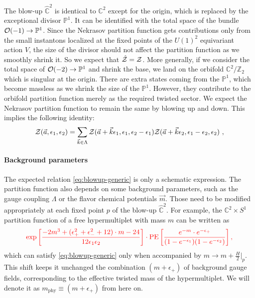 \documentclass[letterpaper, 11pt]{article}
\def\IC{\mathbb{C}}
\def\IP{\mathbb{P}}
\def\IZ{\mathbb{Z}}
\def\CO{{\cal O}}
\def\CZ{{\cal Z}}
\def\e{\epsilon}
\begin{document}
The blow-up $\hat{\IC}^2$ is identical to $\IC^2$ except for the origin, which is replaced by the exceptional divisor $\IP^1$. It can be identified with the total space of the bundle $\CO(-1) \to \IP^1$. 
Since the Nekrasov partition function gets contributions only from the small instantons localized at the fixed points of the $U(1)^2$ equivariant action $V$, the size of the divisor should not affect the partition function as we smoothly shrink it. So we expect that $\hat{\CZ} = \CZ$. More generally, if we consider the total space of $\CO(-2) \to \IP^1$ and shrink the base, we land on the orbifold $\IC^2/\IZ_2$ which is singular at the origin. There are extra states coming from the $\IP^1$, which become massless as we shrink the size of the $\IP^1$. However, they contribute to the orbifold partition function merely as the required twisted sector. We expect the Nekrasov partition function to remain the same by blowing up and down. This implies the following  identity: \cite{Nakajima:2003pg, Nakajima:2003uh,Nakajima:2005fg,Keller:2012da,Gu:2018gmy,Gu:2019dan}
\begin{align} 
  \label{eq:blowup-generic}
  \CZ(\vec{a}, \e_1, \e_2) = \sum_{\vec{k} \in \Lambda} \CZ(\vec{a}+ \vec{k} \e_1, \e_1, \e_2 - \e_1) \CZ(\vec{a}+\vec{k} \e_2, \e_1 - \e_2, \e_2) \ , 
\end{align}

%


\paragraph{Background parameters}

The expected relation \eqref{eq:blowup-generic} is only a schematic expression.
The partition function also depends on some background parameters, such as the gauge coupling $\Lambda$ or the flavor chemical potentials $\vec{m}$. Those need to be modified appropriately at each fixed point $p$ of the blow-up $\hat{\IC}^2$. 
For example, the $\IC^2 \times S^1$ partition function of a free hypermultiplet with mass $m$ can be written as
\begin{align}
  \color{red}  \exp\left[\frac{-2m^3 +(\e_+^2 + \e_-^2+12) \cdot m-24 }{12\e_1\e_2} \right] \cdot \text{PE}\left[\frac{e^{-m}\cdot e^{-\e_+}}{(1-e^{-\e_1})(1-e^{-\e_2})}\right],
\end{align}
which can satisfy \eqref{eq:blowup-generic} only when accompanied by $m \rightarrow m + \frac{H}{2}|_p$. 
This shift keeps it unchanged the combination $(m + \e_+)$ of background gauge fields, corresponding to the effective twisted mass of the hypermultiplet. We will denote it as $m_\text{phy} \equiv (m+ \e_+)$ from here on. 
\end{document}
